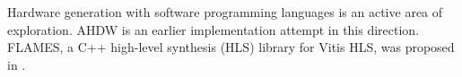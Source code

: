 Hardware generation with software programming languages is an active area of exploration.
AHDW \cite{zhao2023automatic} is an earlier implementation attempt in this direction.
FLAMES, a C++ high-level synthesis (HLS) library for Vitis HLS,
was proposed in \cite{zhao2024flexible}.
